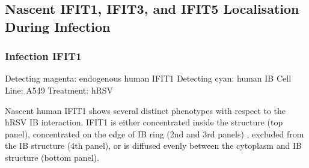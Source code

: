 \subsection{Nascent IFIT1, IFIT3, and IFIT5 Localisation During Infection} \label{subsec:Nascent IFIT1, IFIT3, and IFIT5 Localisation During Infection}
\subsubsection{Infection IFIT1}
Detecting magenta: endogenous human IFIT1 \newline
Detecting cyan: human IB \newline
Cell Line: A549 \newline
Treatment: hRSV \newline

Nascent human IFIT1 shows several distinct phenotypes with respect to the hRSV IB interaction. IFIT1 is either concentrated inside the structure (top panel), concentrated on the edge of IB ring (2nd and 3rd panels)  , excluded from the IB structure (4th panel),  or is diffused evenly between the cytoplasm and IB structure (bottom panel).


